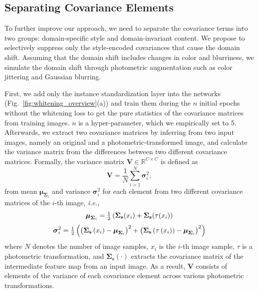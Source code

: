 \documentclass[final]{latex/cvpr}
\begin{document}
\vspace*{-0.05cm}
\subsection{Separating Covariance Elements}\label{method:deep_instance_selective_whitening}
\vspace*{-0.1cm}
To further improve our approach, we need to separate the covariance terms into two groups: domain-specific style and domain-invariant content. We propose to selectively suppress only the style-encoded covariances that cause the domain shift. Assuming that the domain shift includes changes in color and blurriness, we simulate the domain shift through photometric augmentation such as color jittering and Gaussian blurring.

First, we add only the instance standardization layer into the networks (Fig.~\ref{fig:whitening_overview}(a)) and train them during the $n$ initial epochs
without the whitening loss to get the pure statistics of the covariance matrices from training images. $n$ is a hyper-parameter, which we empirically set to 5. Afterwards, we extract two covariance matrices by inferring from two input images, namely an original and a photometric-transformed image, and calculate the variance matrix from the differences between two different covariance matrices. 
Formally, the variance matrix $\mathbf{V}\in\mathbb{R}^{C\times C}$ is defined as
\vspace*{-0.1cm}
\begin{equation} \label{eq_var_covar_sigma}
\mathbf{V}=\frac{1}{N}\sum_{i=1}^N\boldsymbol{\sigma}_i^2,
\end{equation}
from mean $\boldsymbol{\mu}_{\mathbf{\Sigma}_i}$ and variance $\boldsymbol{\sigma}_i^2$ for each element from two different covariance matrices of the $i$-th image, \textit{i.e.,}
\vspace*{-0.1cm}
\begin{equation} \label{eq_var_covar_mu}
\boldsymbol{\mu}_{\mathbf{\Sigma}_i}=\tfrac{1}{2}\left(\mathbf{\Sigma_s}({x_i})+ \mathbf{\Sigma_s}(\tau(x_i)\right)
\vspace*{-0.2cm}
\end{equation}
\begin{equation} \label{eq_var_covar_sig}
\boldsymbol{\sigma}_i^2=\tfrac{1}{2}\left(\left(\mathbf{\Sigma_s}\left({x_i}\right)-\boldsymbol{\mu}_{\mathbf{\Sigma}_i}\right)^2 + \left(\mathbf{\Sigma_s}\left(\tau\left(x_i\right)\right)-\boldsymbol{\mu}_{\mathbf{\Sigma}_i}\right)^2\right)
\vspace*{-0.1cm}
\end{equation}
where $N$ denotes the number of image samples, $x_i$ is the $i$-th image sample, $\tau$ is a photometric transformation, and $\mathbf{\Sigma_s}(\cdot)$ extracts the covariance matrix of the intermediate feature map from an input image.
As a result, $\mathbf{V}$ consists of elements of the variance of each covariance element across various photometric transformations.
\end{document}
